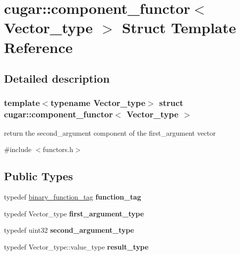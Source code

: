 \hypertarget{structcugar_1_1component__functor}{}\section{cugar\+:\+:component\+\_\+functor$<$ Vector\+\_\+type $>$ Struct Template Reference}
\label{structcugar_1_1component__functor}


\subsection{Detailed description}
\subsubsection*{template$<$typename Vector\+\_\+type$>$\newline
struct cugar\+::component\+\_\+functor$<$ Vector\+\_\+type $>$}

return the second\+\_\+argument component of the first\+\_\+argument vector 

{\ttfamily \#include $<$functors.\+h$>$}

\subsection*{Public Types}
\begin{DoxyCompactItemize}
\item 
\mbox{\label{structcugar_1_1component__functor_a4d67ff3e96a90a60416606444a30ed60}} 
typedef \hyperlink{structcugar_1_1binary__function__tag}{binary\+\_\+function\+\_\+tag} {\bfseries function\+\_\+tag}
\item 
\mbox{\label{structcugar_1_1component__functor_ad32cef8cadf59d513f4fcca43d5b7a67}} 
typedef Vector\+\_\+type {\bfseries first\+\_\+argument\+\_\+type}
\item 
\mbox{\label{structcugar_1_1component__functor_aadf2561788737067f7e181d2137d89e4}} 
typedef uint32 {\bfseries second\+\_\+argument\+\_\+type}
\item 
\mbox{\label{structcugar_1_1component__functor_ae00f23803ffb15f3d9945bb0cf5a468f}} 
typedef Vector\+\_\+type\+::value\+\_\+type {\bfseries result\+\_\+type}
\end{DoxyCompactItemize}
